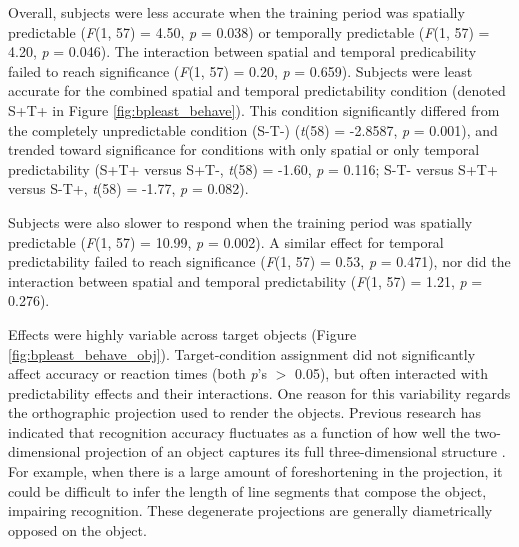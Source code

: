 \documentclass[dwyatte_dissertation.tex]{subfiles}
\begin{document}

Overall, subjects were less accurate when the training period was spatially predictable (\textit{F}(1, 57) = 4.50, \textit{p} = 0.038) or temporally predictable (\textit{F}(1, 57) = 4.20, \textit{p} = 0.046). The interaction between spatial and temporal predicability failed to reach significance (\textit{F}(1, 57) = 0.20, \textit{p} = 0.659). Subjects were least accurate for the combined spatial and temporal predictability condition (denoted S+T+ in Figure \ref{fig:bpleast_behave}). This condition significantly differed from the completely unpredictable condition (S-T-) (\textit{t}(58) = -2.8587, \textit{p} = 0.001), and trended toward significance for conditions with only spatial or only temporal predictability (S+T+ versus S+T-, \textit{t}(58) = -1.60, \textit{p} = 0.116; S-T- versus S+T+ versus S-T+, \textit{t}(58) = -1.77, \textit{p} = 0.082).


Subjects were also slower to respond when the training period was spatially predictable (\textit{F}(1, 57) = 10.99, \textit{p} = 0.002). A similar effect for temporal predictability failed to reach significance (\textit{F}(1, 57) = 0.53, \textit{p} = 0.471), nor did the interaction between spatial and temporal predictability (\textit{F}(1, 57) = 1.21, \textit{p} = 0.276). 

Effects were highly variable across target objects (Figure \ref{fig:bpleast_behave_obj}). Target-condition assignment did not significantly affect accuracy or reaction times (both \textit{p}'s $>$ 0.05), but often interacted with predictability effects and their interactions. One reason for this variability regards the orthographic projection used to render the objects. Previous research has indicated that recognition accuracy fluctuates as a function of how well the two-dimensional projection of an object captures its full three-dimensional structure \cite{BalasSinha09}. For example, when there is a large amount of foreshortening in the projection, it could be difficult to infer the length of line segments that compose the object, impairing recognition. These degenerate projections are generally diametrically opposed on the object. 
\end{document}
